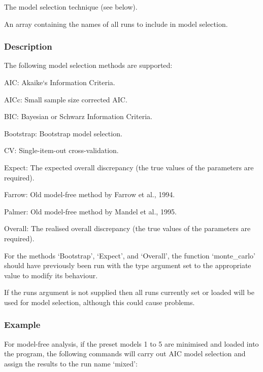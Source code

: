   The model selection technique (see below).

  An array containing the names of all runs to include in model selection.

\subsubsection{Description}

The following model selection methods are supported:

AIC:  Akaike`s Information Criteria.

AICc:  Small sample size corrected AIC.

BIC:  Bayesian or Schwarz Information Criteria.

Bootstrap:  Bootstrap model selection.

CV:  Single-item-out cross-validation.

Expect:  The expected overall discrepancy (the true values of the parameters are required).

Farrow:  Old model-free method by Farrow et al., 1994.

Palmer:  Old model-free method by Mandel et al., 1995.

Overall:  The realised overall discrepancy (the true values of the parameters are required).

For the methods `Bootstrap', `Expect', and `Overall', the function `monte\_carlo' should have
previously been run with the type argument set to the appropriate value to modify its
behaviour.

If the runs argument is not supplied then all runs currently set or loaded will be used for
model selection, although this could cause problems.


\subsubsection{Example}

For model-free analysis, if the preset models 1 to 5 are minimised and loaded into the
program, the following commands will carry out AIC model selection and assign the results
to the run name `mixed':





\newpage

